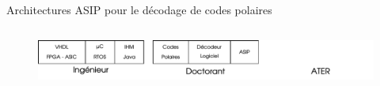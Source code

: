 \documentclass[t,compress,mathserif,12pt,xcolor=dvipsnames]{beamer}
\begin{document}
\begin{frame}[t]{Architectures ASIP pour le décodage de codes polaires}
\begin{minipage}[t][5.0cm][t]{\textwidth}
\begin{columns}[T]
\begin{column}{0.04\textwidth}
      \end{column}
      \begin{column}{0.40\textwidth}
      \end{column}
    \end{columns}
  \end{minipage}
  \begin{figure}[htp]
    \centering
    \includegraphics[width=\textwidth]{fig/frise7}
  \end{figure}


\end{frame}
\end{document}
